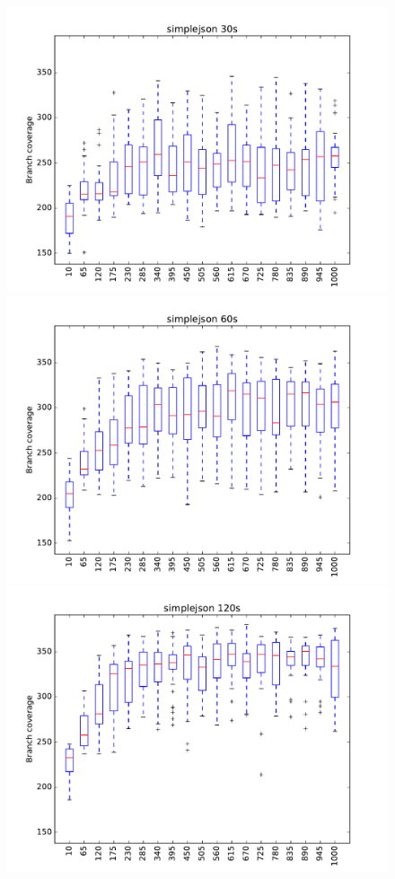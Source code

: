 \begin{figure}
\includegraphics[width=\columnwidth]{graphs/simplejsonrand30}
\includegraphics[width=\columnwidth]{graphs/simplejsonrand60}
\includegraphics[width=\columnwidth]{graphs/simplejsonrand120}
\end{figure}

